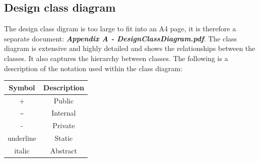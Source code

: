 \documentclass[11pt,a4paper]{article}
\begin{document}
\subsection{Design class diagram}
\label{ss:design-class-diagram}
The design class digram is too large to fit into an A4 page, it is therefore a separate document: \textit{\textbf{Appendix A - DesignClassDiagram.pdf}}. The class diagram is extensive and highly detailed and shows the relationships between the classes. It also captures the hierarchy between classes. The following is a description of the notation used within the class diagram:
\begin{center}
    \begin{tabular}{|c|c|}
        \hline
        \textbf{Symbol} & \textbf{Description} \\
        \hline
        + & Public \\
        \textasciitilde  & Internal \\
        - & Private \\
        underline & Static \\
        italic & Abstract \\
        \hline
    \end{tabular}    
\end{center}
\end{document}

